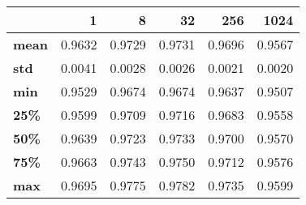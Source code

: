 \begin{tabular}{lrrrrr}
\toprule
{} &       1 &       8 &      32 &     256 &    1024 \\
\midrule
\textbf{mean} &  0.9632 &  0.9729 &  0.9731 &  0.9696 &  0.9567 \\
\textbf{std } &  0.0041 &  0.0028 &  0.0026 &  0.0021 &  0.0020 \\
\textbf{min } &  0.9529 &  0.9674 &  0.9674 &  0.9637 &  0.9507 \\
\textbf{25\% } &  0.9599 &  0.9709 &  0.9716 &  0.9683 &  0.9558 \\
\textbf{50\% } &  0.9639 &  0.9723 &  0.9733 &  0.9700 &  0.9570 \\
\textbf{75\% } &  0.9663 &  0.9743 &  0.9750 &  0.9712 &  0.9576 \\
\textbf{max } &  0.9695 &  0.9775 &  0.9782 &  0.9735 &  0.9599 \\
\bottomrule
\end{tabular}

